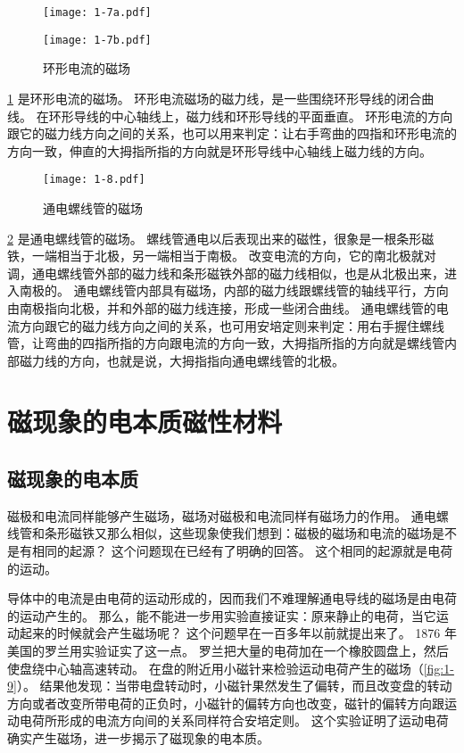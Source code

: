 \begin{figure}
  \begin{minipage}[b]{0.48\linewidth}\centering
    \texttt{[image: 1-7a.pdf]}
    \label{fig:1-7a}
  \end{minipage}
  \begin{minipage}[b]{0.48\linewidth}\centering
    \texttt{[image: 1-7b.pdf]}
    \label{fig:1-7b}
  \end{minipage}
  \caption{环形电流的磁场}\label{fig:1-7}
\end{figure}

\cref{fig:1-7} 是环形电流的磁场。
环形电流磁场的磁力线，是一些围绕环形导线的闭合曲线。
在环形导线的中心轴线上，磁力线和环形导线的平面垂直。
环形电流的方向跟它的磁力线方向之间的关系，也可以用来判定：让右手弯曲的四指和环形电流的方向一致，伸直的大拇指所指的方向就是环形导线中心轴线上磁力线的方向。

\begin{figure}
\texttt{[image: 1-8.pdf]}
\caption{通电螺线管的磁场}\label{fig:1-8}
\end{figure}

\cref{fig:1-8} 是通电螺线管的磁场。
螺线管通电以后表现出来的磁性，很象是一根条形磁铁，一端相当于北极，另一端相当于南极。
改变电流的方向，它的南北极就对调，通电螺线管外部的磁力线和条形磁铁外部的磁力线相似，也是从北极出来，进入南极的。
通电螺线管内部具有磁场，内部的磁力线跟螺线管的轴线平行，方向由南极指向北极，并和外部的磁力线连接，形成一些闭合曲线。
通电螺线管的电流方向跟它的磁力线方向之间的关系，也可用安培定则来判定：用右手握住螺线管，让弯曲的四指所指的方向跟电流的方向一致，大拇指所指的方向就是螺线管内部磁力线的方向，也就是说，大拇指指向通电螺线管的北极。

\section{磁现象的电本质\texorpdfstring{\quad}{ }磁性材料}
\subsection{磁现象的电本质}

磁极和电流同样能够产生磁场，磁场对磁极和电流同样有磁场力的作用。
通电螺线管和条形磁铁又那么相似，这些现象使我们想到：磁极的磁场和电流的磁场是不是有相同的起源？
这个问题现在已经有了明确的回答。
这个相同的起源就是电荷的运动。

导体中的电流是由电荷的运动形成的，因而我们不难理解通电导线的磁场是由电荷的运动产生的。
那么，能不能进一步用实验直接证实：原来静止的电荷，当它运动起来的时候就会产生磁场呢？
这个问题早在一百多年以前就提出来了。
1876 年美国的罗兰用实验证实了这一点。
罗兰把大量的电荷加在一个橡胶圆盘上，然后使盘绕中心轴高速转动。
在盘的附近用小磁针来检验运动电荷产生的磁场（\cref{fig:1-9}）。
结果他发现：当带电盘转动时，小磁针果然发生了偏转，而且改变盘的转动方向或者改变所带电荷的正负时，小磁针的偏转方向也改变，磁针的偏转方向跟运动电荷所形成的电流方向间的关系同样符合安培定则。
这个实验证明了运动电荷确实产生磁场，进一步揭示了磁现象的电本质。

